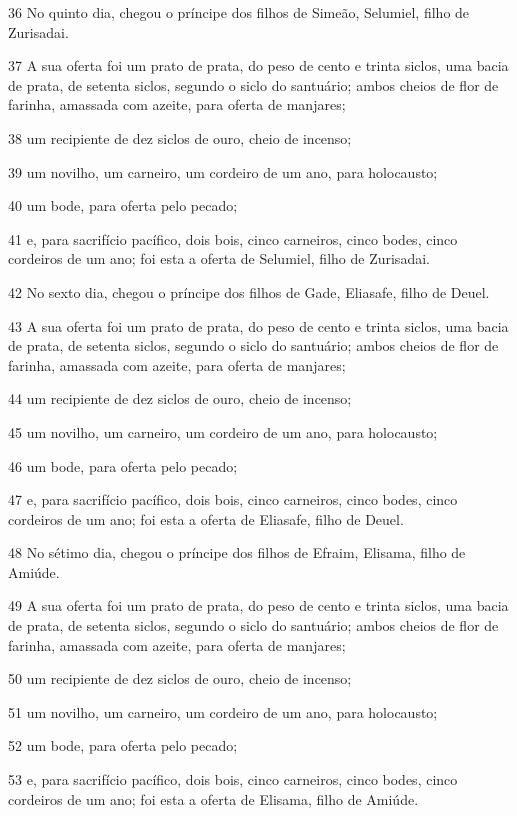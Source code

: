 \par 36 No quinto dia, chegou o príncipe dos filhos de Simeão, Selumiel, filho de Zurisadai.
\par 37 A sua oferta foi um prato de prata, do peso de cento e trinta siclos, uma bacia de prata, de setenta siclos, segundo o siclo do santuário; ambos cheios de flor de farinha, amassada com azeite, para oferta de manjares;
\par 38 um recipiente de dez siclos de ouro, cheio de incenso;
\par 39 um novilho, um carneiro, um cordeiro de um ano, para holocausto;
\par 40 um bode, para oferta pelo pecado;
\par 41 e, para sacrifício pacífico, dois bois, cinco carneiros, cinco bodes, cinco cordeiros de um ano; foi esta a oferta de Selumiel, filho de Zurisadai.
\par 42 No sexto dia, chegou o príncipe dos filhos de Gade, Eliasafe, filho de Deuel.
\par 43 A sua oferta foi um prato de prata, do peso de cento e trinta siclos, uma bacia de prata, de setenta siclos, segundo o siclo do santuário; ambos cheios de flor de farinha, amassada com azeite, para oferta de manjares;
\par 44 um recipiente de dez siclos de ouro, cheio de incenso;
\par 45 um novilho, um carneiro, um cordeiro de um ano, para holocausto;
\par 46 um bode, para oferta pelo pecado;
\par 47 e, para sacrifício pacífico, dois bois, cinco carneiros, cinco bodes, cinco cordeiros de um ano; foi esta a oferta de Eliasafe, filho de Deuel.
\par 48 No sétimo dia, chegou o príncipe dos filhos de Efraim, Elisama, filho de Amiúde.
\par 49 A sua oferta foi um prato de prata, do peso de cento e trinta siclos, uma bacia de prata, de setenta siclos, segundo o siclo do santuário; ambos cheios de flor de farinha, amassada com azeite, para oferta de manjares;
\par 50 um recipiente de dez siclos de ouro, cheio de incenso;
\par 51 um novilho, um carneiro, um cordeiro de um ano, para holocausto;
\par 52 um bode, para oferta pelo pecado;
\par 53 e, para sacrifício pacífico, dois bois, cinco carneiros, cinco bodes, cinco cordeiros de um ano; foi esta a oferta de Elisama, filho de Amiúde.
